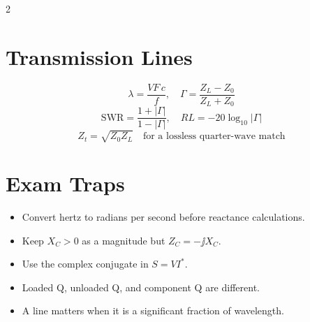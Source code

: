 \documentclass[10pt,letterpaper]{article}
\begin{document}
\begin{multicols}{2}
\section*{Transmission Lines}
\[
\lambda=\frac{VF\,c}{f},\quad
\Gamma=\frac{Z_L-Z_0}{Z_L+Z_0}
\]
\[
\mathrm{SWR}=\frac{1+|\Gamma|}{1-|\Gamma|},\quad
RL=-20\log_{10}|\Gamma|
\]
\[
Z_t=\sqrt{Z_0Z_L}\quad\text{for a lossless quarter-wave match}
\]

\section*{Exam Traps}
\begin{itemize}
\item Convert hertz to radians per second before reactance calculations.
\item Keep \(X_C>0\) as a magnitude but \(Z_C=-\jj X_C\).
\item Use the complex conjugate in \(S=VI^*\).
\item Loaded Q, unloaded Q, and component Q are different.
\item A line matters when it is a significant fraction of wavelength.
\end{itemize}
\end{multicols}
\end{document}
